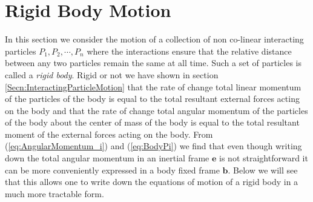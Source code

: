 \documentclass[graybox,envcountchap,sectrefs]{svmonoMuga}
\begin{document}
\section{Rigid Body Motion}\label{Secn:RigidBodyKinematics}
In this section we consider the motion of a collection of non co-linear interacting particles $P_1,P_2,\cdots,P_n$ where the interactions ensure that the relative distance between any two particles remain the same at all time. Such a set of particles is called a \textit{rigid body}. Rigid or not we have shown in section \ref{Secn:InteractingParticleMotion} that 
the rate of change total linear momentum of the particles of the body is equal to the total resultant external forces acting on the body and that the rate of change total  angular momentum of the particles of the body about the center of mass of the body is equal to the total resultant moment of the external forces acting on the body. 
From (\ref{eq:AngularMomentum_i}) and (\ref{eq:BodyPi}) we find that even though writing down the total angular momentum in an inertial frame $\mathbf{e}$ is not straightforward it can be more conveniently expressed in a body fixed frame $\mathbf{b}$. Below we will see that this allows one to write down the equations of motion of a rigid body in a much more tractable form.

\end{document}

